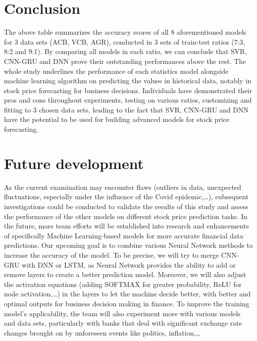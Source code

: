 \documentclass{ieeeojies}
\begin{document}
{\section{Conclusion}
\begin{flushleft}
\hspace{0.4cm}The above table summarizes the accuracy scores of all 8 aforementioned models for 3 data sets (ACB, VCB, AGR), conducted in 3 sets of train-test ratios (7:3, 8:2 and 9:1). By comparing all models in each ratio, we can conclude that SVR, CNN-GRU and DNN prove their outstanding performances above the rest. The whole study underlines the performance of each statistics model alongside machine learning algorithm on predicting the values in historical data, notably in stock price forecasting for business decisions. Individuals have demonstrated their pros and cons throughout experiments, testing on various ratios, customizing and fitting to 3 chosen data sets, leading to the fact that SVR, CNN-GRU and DNN have the potential to be used for building advanced models for stock price forecasting.
\end{flushleft}

\section{Future development}
\begin{flushleft}
\hspace{0.4cm}As the current examination may encounter flaws (outliers in data, unexpected fluctuations, especially under the influence of the Covid epidemic,…), subsequent investigations could be conducted to validate the results of this study and assess the performance of the other models on different stock price prediction tasks. In the future, more team efforts will be established into research and enhancements of specifically Machine Learning-based models for more accurate financial data predictions. Our upcoming goal is to combine various Neural Network methods to increase the accuracy of the model. To be precise, we will try to merge CNN-GRU with DNN or LSTM, as Neural Network provides the ability to add or remove layers to create a better prediction model. Moreover, we will also adjust the activation equations (adding SOFTMAX for greater probability, ReLU for node activation,…) in the layers to let the machine decide better, with better and optimal outputs for business decision making in finance. To improve the training model's applicability, the team will also experiment more with various models and data sets, particularly with banks that deal with significant exchange rate changes brought on by unforeseen events like politics, inflation,…
\end{flushleft}

}
\end{document}
